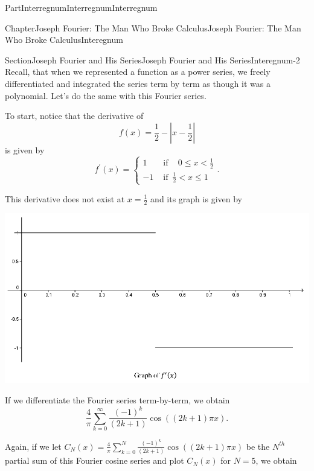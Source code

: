 \documentclass[oneside,10pt,]{book}
\numberwithin{equation}{part}
\newcommand{\abs}[1]{\left|#1\right|}
\newcommand{\lt}{<}
\newcommand{\amp}{&}
\begin{document}
\begin{partptx}{Part}{Interregnum}{}{Interregnum}{}{}{Interregnum}
\begin{chapterptx}{Chapter}{Joseph Fourier: The Man Who Broke Calculus}{}{Joseph Fourier: The Man Who Broke Calculus}{}{}{Interegnum}
\begin{sectionptx}{Section}{Joseph Fourier and His Series}{}{Joseph Fourier and His Series}{}{}{Interegnum-2}
Recall, that when we represented a function as a power series, we freely differentiated and integrated the series term by term as though it was a polynomial. Let's do the same with this Fourier series.%
\par
To start, notice that the derivative of%
\begin{equation*}
f(x)=\frac{1}{2}-\abs{x-\frac{1}{2}}
\end{equation*}
is given by%
\begin{equation*}
f^\prime(x) = \begin{cases}1\amp \text{ if } \,\text{ } 0\leq x\lt \frac{1}{2}\\ -1\amp \text{ if } \,\frac{1}{2}\lt x\leq 1 \end{cases} \text{.}
\end{equation*}
%
\par
This derivative does not exist at \(x=\frac{1}{2}\) and its graph is given by%
\begin{image}{0.125}{0.75}{0.125}{}%
\includegraphics[width=\linewidth]{external/images/Ch2fig1.png}
\end{image}%
If we differentiate the Fourier series term-by-term, we obtain%
\begin{equation*}
\frac{4}{\pi}\sum_{k=0}^\infty\frac{\left(-1\right)^k}{\left(2k+1\right)} \cos\left(\left(2k+1\right)\pi x\right)\text{.}
\end{equation*}
%
\par
Again, if we let \(C_N(x)=\frac{4}{\pi}\sum_{k=0}^N\frac{\left(-1\right)^k}{\left(2k+1\right)} \cos\left(\left(2k+1\right)\pi x\right)\) be the \(N^{th}\) partial sum of this Fourier cosine series and plot \(C_N(x)\) for \(N=5\), we obtain%
\begin{image}{0.125}{0.75}{0.125}{}%

\end{image}
\end{sectionptx}
\end{chapterptx}
\end{partptx}
\end{document}
